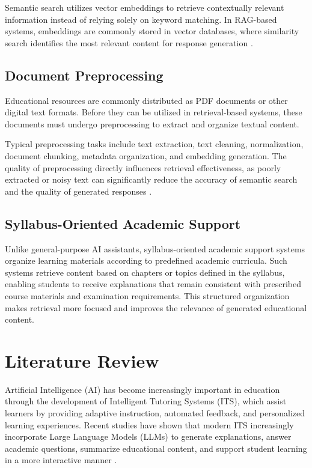 Semantic search utilizes vector embeddings to retrieve contextually relevant information instead of relying solely on keyword matching. In RAG-based systems, embeddings are commonly stored in vector databases, where similarity search identifies the most relevant content for response generation \cite{5lewis2020rag,6asenov2025retrieval}.

\subsection{Document Preprocessing}

Educational resources are commonly distributed as PDF documents or other digital text formats. Before they can be utilized in retrieval-based systems, these documents must undergo preprocessing to extract and organize textual content. \par

Typical preprocessing tasks include text extraction, text cleaning, normalization, document chunking, metadata organization, and embedding generation. The quality of preprocessing directly influences retrieval effectiveness, as poorly extracted or noisy text can significantly reduce the accuracy of semantic search and the quality of generated responses \cite{2yadav2022summarization,6asenov2025retrieval}. \par

\subsection{Syllabus-Oriented Academic Support}
Unlike general-purpose AI assistants, syllabus-oriented academic support systems organize learning materials according to predefined academic curricula. Such systems retrieve content based on chapters or topics defined in the syllabus, enabling students to receive explanations that remain consistent with prescribed course materials and examination requirements. This structured organization makes retrieval more focused and improves the relevance of generated educational content. \par

\section{Literature Review}

Artificial Intelligence (AI) has become increasingly important in education through the development of Intelligent Tutoring Systems (ITS), which assist learners by providing adaptive instruction, automated feedback, and personalized learning experiences. Recent studies have shown that modern ITS increasingly incorporate Large Language Models (LLMs) to generate explanations, answer academic questions, summarize educational content, and support student learning in a more interactive manner \cite{1wang2023its,4gan2023llmeducation}. \par

